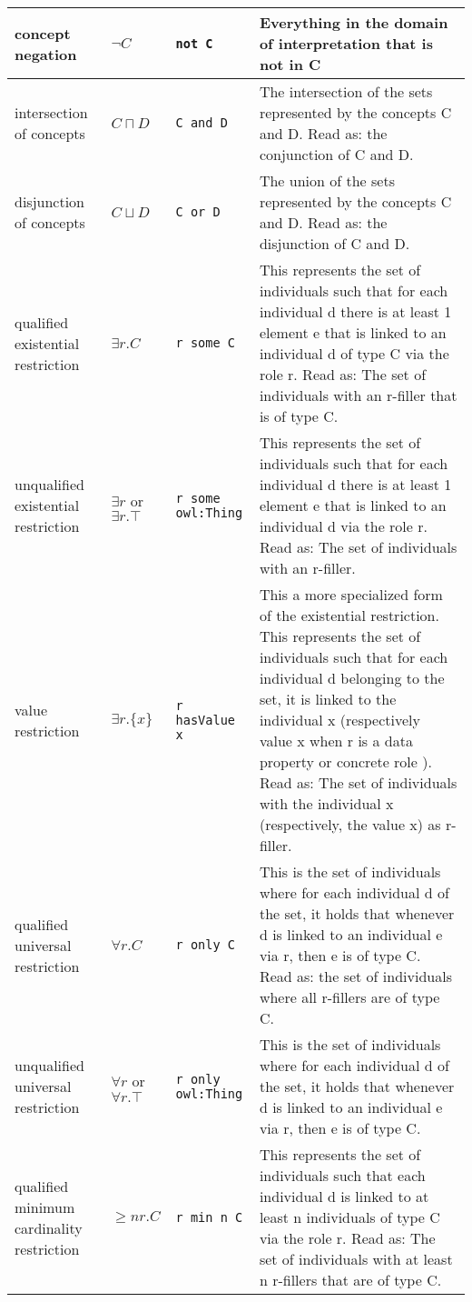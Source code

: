 \documentclass{amsart}
\begin{document}
\begin{longtable}{|>{\footnotesize}p{2.5cm}|>{\footnotesize}p{1.5cm}|>{\footnotesize}p{3.5cm}|>{\footnotesize}p{5cm}|}
			\hline					
			concept negation & $\neg C$ & \texttt{not C} & Everything in the domain of interpretation that is not in C \\
			\hline			
			intersection of concepts & $C \sqcap D$ & \texttt{C and D} & The intersection of the sets represented by the concepts C and D. Read as: the conjunction of C and D.\\
			\hline
			disjunction of concepts & $C \sqcup D$ & \texttt{C or D} & The union of the sets represented by the concepts C and D. Read as: the disjunction of C and D.\\
			\hline
			qualified existential restriction & $\exists r.C$ & \texttt{r some C} & This represents the set of individuals such that for each individual d there is at least 1 element e that is linked to an individual d of type C via the role r. Read as: The set of individuals with an r-filler that is of type C.\\
			\hline
			unqualified existential restriction & $\exists r$ or $\exists r.\top$ & \texttt{r some owl:Thing} & This represents the set of individuals such that for each individual d there is at least 1 element e that is linked to an individual d via the role r. Read as: The set of individuals with an r-filler.\\
			\hline
			value restriction & $\exists r.\{x\}$ & \texttt{r hasValue x} & This a more specialized form of the existential restriction. This represents the set of individuals such that for each individual d belonging to the set, it is linked to the individual x (respectively value x when r is a data property or concrete role ). Read as: The set of individuals with the individual x (respectively, the value x) as r-filler.\\
			\hline
			qualified universal restriction & $\forall r.C$ & \texttt{r only C} & This is the set of individuals where for each individual d of the set, it holds that whenever d is linked to an individual e via r, then e is of type C. Read as: the set of individuals where all r-fillers are of type C.\\						
			\hline  
			unqualified universal restriction & $\forall r$ or $\forall r.\top$ & \texttt{r only owl:Thing} & This is the set of individuals where for each individual d of the set, it holds that whenever d is linked to an individual e via r, then e is of type C.\\						
			\hline		
			qualified minimum cardinality restriction & $\geq n r.C$ & \texttt{r min n C} & This represents the set of individuals such that each individual d is linked to at least n individuals of type C via the role r. Read as: The set of individuals with at least n r-fillers that are of type C.\\

\end{longtable}
\end{document}
